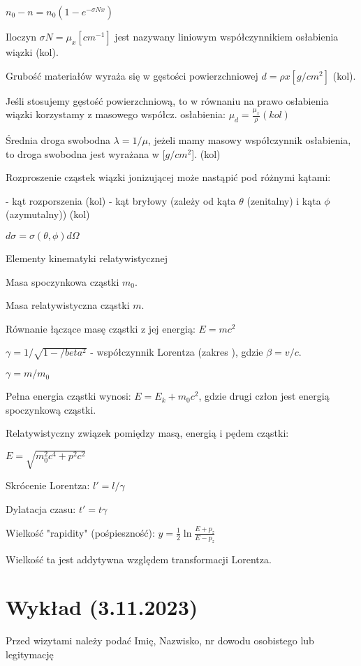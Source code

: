 \documentclass{article}
\begin{document}
$n_0 - n = n_0(1-e^{-\sigma N x})$

Iloczyn $\sigma N = \mu_x [cm^{-1}]$ jest nazywany liniowym współczynnikiem osłabienia wiązki (kol).

Grubość materiałów wyraża się w gęstości powierzchniowej $d = \rho x [g/cm^2]$ (kol).

Jeśli stosujemy gęstość powierzchniową, to w równaniu na prawo osłabienia wiązki korzystamy z masowego współcz. osłabienia: $\mu_d=\frac{\mu_x}{\rho} (kol)$

Średnia droga swobodna $\lambda = 1/\mu$, jeżeli mamy masowy współczynnik osłabienia, to droga swobodna jest wyrażana w [$g/cm^2$]. (kol)

Rozproszenie cząstek wiązki jonizującej może nastąpić pod różnymi kątami:

- kąt rozporszenia (kol)
- kąt bryłowy (zależy od kąta $\theta$ (zenitalny) i kąta $\phi$ (azymutalny)) (kol)

$d\sigma = \sigma(\theta,\phi)d\Omega$

Elementy kinematyki relatywistycznej

Masa spoczynkowa cząstki $m_0$.

Masa relatywistyczna cząstki $m$.

Równanie łączące masę cząstki z jej energią:
$E = mc^2$

$\gamma = 1/\sqrt{1-/beta^2}$ - współczynnik Lorentza (zakres ), gdzie $\beta = v/c$.

$\gamma = m/m_0$

Pełna energia cząstki wynosi:
$E = E_k + m_0c^2$, gdzie drugi człon jest energią spoczynkową cząstki.

Relatywistyczny związek pomiędzy masą, energią i pędem cząstki:

$E = \sqrt{m_0^2c^4 + p^2c^2}$

Skrócenie Lorentza: $l' = l/\gamma$

Dylatacja czasu: $t' = t\gamma$

Wielkość "rapidity" (pośpieszność):
$y = \frac{1}{2}\ln{\frac{E+p_z}{E-p_z}}$

Wielkość ta jest addytywna względem transformacji Lorentza.

\section{Wykład (3.11.2023)}

Przed wizytami należy podać Imię, Nazwisko, nr dowodu osobistego lub legitymację
\end{document}
